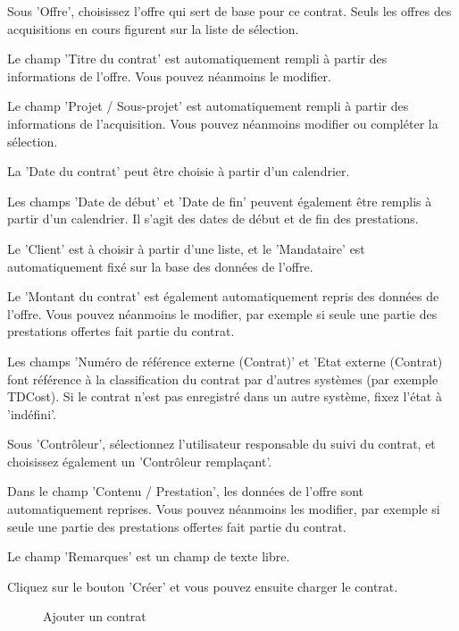 \begin{compactitem}
\item {\sffamily\color{black}
Sous 'Offre', choisissez l'offre qui sert de base pour ce contrat. Seuls les offres des acquisitions en cours figurent sur la liste de sélection.}
\item
Le champ 'Titre du contrat' est automatiquement rempli à partir des informations de l'offre. Vous pouvez néanmoins le modifier.
\item
Le champ 'Projet / Sous-projet' est automatiquement rempli à partir des informations de l'acquisition. Vous pouvez néanmoins modifier ou compléter la sélection.
\item
La 'Date du contrat' peut être choisie à partir d'un calendrier.
\item
Les champs 'Date de début' et 'Date de fin' peuvent également être remplis à partir d'un calendrier. Il s'agit des dates de début et de fin des prestations.
\item
Le 'Client' est à choisir à partir d'une liste, et le 'Mandataire' est automatiquement fixé sur la base des données de l'offre.
\item
Le 'Montant du contrat' est également automatiquement repris des données de l'offre. Vous pouvez néanmoins le modifier, par exemple si seule une partie des prestations offertes fait partie du contrat.
\item
Les champs 'Numéro de référence externe (Contrat)' et 'Etat externe (Contrat) font référence à la classification du contrat par d'autres systèmes (par exemple TDCost). Si le contrat n'est pas enregistré dans un autre système, fixez l'état à 'indéfini'.
\item
Sous 'Contrôleur', sélectionnez l'utilisateur responsable du suivi du contrat, et choisissez également un 'Contrôleur remplaçant'.
\item
Dans le champ 'Contenu / Prestation', les données de l'offre sont automatiquement reprises. Vous pouvez néanmoins les modifier, par exemple si seule une partie des prestations offertes fait partie du contrat.
\item
Le champ 'Remarques' est un champ de texte libre.
\end{compactitem}

\vspace{\baselineskip}

Cliquez sur le bouton 'Créer'  et vous pouvez ensuite charger le contrat.

\begin{figure}[H]
\caption{Ajouter un contrat}
\end{figure}

